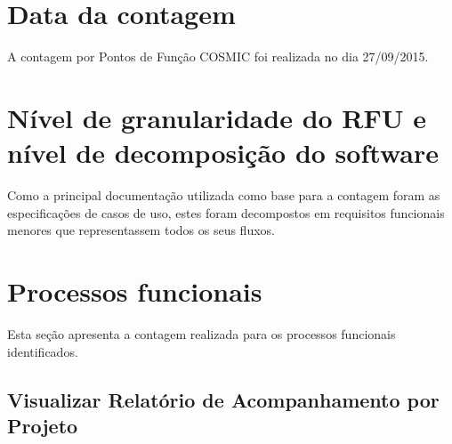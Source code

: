 \section{Data da contagem}

  A contagem por Pontos de Função COSMIC foi realizada no dia 27/09/2015.


\section{Nível de granularidade do RFU e nível de decomposição do software}
  
   Como a principal documentação utilizada como base para a contagem foram as especificações de casos de uso, 
   estes foram decompostos em requisitos funcionais menores que representassem todos os seus fluxos.

\vfill
\pagebreak
\section{Processos funcionais}
  
  Esta seção apresenta a contagem realizada para os processos funcionais identificados.
  
  \subsection{Visualizar Relatório de Acompanhamento por Projeto}
  
